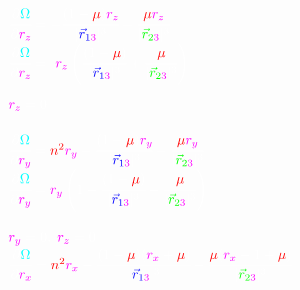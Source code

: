 \documentclass{article}
\newcommand{\dash}{\scalebox{0.5}[1.0]{$-$}}
\begin{document}

$
\color{white}\cfrac{\partial\color{cyan}\Omega}{\partial \color{mag}r_z}=
-\cfrac{(1-\color{red}\mu\color{white})\color{mag}r_z}
{|\color{blue}\vec{r}_{1\color{mag}3}\color{white}|^3}-
\cfrac{\color{red}\mu\color{white}\color{mag}r_z}
{|\color{green}\vec{r}_{2\color{mag}3}\color{white}|^3}
$\\

$
\color{white}\cfrac{\partial\color{cyan}\Omega}{\partial \color{mag}r_z}=
\dash\color{mag}r_z\color{white}\left(
\cfrac{(1-\color{red}\mu\color{white})}
{|\color{blue}\vec{r}_{1\color{mag}3}\color{white}|^3}+
\cfrac{\color{red}\mu\color{white}}
{|\color{green}\vec{r}_{2\color{mag}3}\color{white}|^3}
\right)
$

$
\color{mag}r_z\color{white}=0
$\\\\


$
\color{white}\cfrac{\partial\color{cyan}\Omega}{\partial \color{mag}r_y}=
\color{red}n^2\color{mag}r_y\color{white}-
\cfrac{(1-\color{red}\mu\color{white})\color{mag}r_y}
{|\color{blue}\vec{r}_{1\color{mag}3}\color{white}|^3}-
\cfrac{\color{red}\mu\color{white}\color{mag}r_y}
{|\color{green}\vec{r}_{2\color{mag}3}\color{white}|^3}
$\\

$
\color{white}\cfrac{\partial\color{cyan}\Omega}{\partial \color{mag}r_y}=
\color{mag}r_y\color{white}\left(
\color{white}1-
\cfrac{(1-\color{red}\mu\color{white})}
{|\color{blue}\vec{r}_{1\color{mag}3}\color{white}|^3}-
\cfrac{\color{red}\mu\color{white}}
{|\color{green}\vec{r}_{2\color{mag}3}\color{white}|^3}
\right)
$\\\\


$
\color{mag}r_y\color{white}=0,\;\color{mag}r_z\color{white}=0
$\\

$
\color{white}\cfrac{\partial\color{cyan}\Omega}{\partial \color{mag}r_x}=
\color{red}n^2\color{mag}r_x\color{white}-
\cfrac{(1-\color{red}\mu\color{white})(\color{mag}r_x\color{white}+\color{red}\mu\color{white})}
{|\color{blue}\vec{r}_{1\color{mag}3}\color{white}|^3}-
\cfrac{\color{red}\mu\color{white}(\color{mag}r_x\color{white}-1+\color{red}\mu\color{white})}
{|\color{green}\vec{r}_{2\color{mag}3}\color{white}|^3}
$\\
\end{document}
